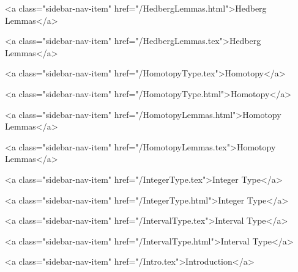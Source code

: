       
    
      
        
          <a class="sidebar-nav-item" href="/HedbergLemmas.html">Hedberg Lemmas</a>
        
      
    
      
        
          <a class="sidebar-nav-item" href="/HedbergLemmas.tex">Hedberg Lemmas</a>
        
      
    
      
        
          <a class="sidebar-nav-item" href="/HomotopyType.tex">Homotopy</a>
        
      
    
      
        
          <a class="sidebar-nav-item" href="/HomotopyType.html">Homotopy</a>
        
      
    
      
        
          <a class="sidebar-nav-item" href="/HomotopyLemmas.html">Homotopy Lemmas</a>
        
      
    
      
        
          <a class="sidebar-nav-item" href="/HomotopyLemmas.tex">Homotopy Lemmas</a>
        
      
    
      
        
          <a class="sidebar-nav-item" href="/IntegerType.tex">Integer Type</a>
        
      
    
      
        
          <a class="sidebar-nav-item" href="/IntegerType.html">Integer Type</a>
        
      
    
      
        
          <a class="sidebar-nav-item" href="/IntervalType.tex">Interval Type</a>
        
      
    
      
        
          <a class="sidebar-nav-item" href="/IntervalType.html">Interval Type</a>
        
      
    
      
        
          <a class="sidebar-nav-item" href="/Intro.tex">Introduction</a>
        
